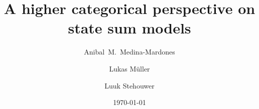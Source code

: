 \documentclass{amsart}
\title{A higher categorical perspective on state sum models}
\author[Medina-Mardones]{Anibal~M.~Medina-Mardones}
\author[Müller]{Lukas Müller}
\author[Stehouwer]{Luuk Stehouwer}
\date{\today}
\begin{document}
	
	\maketitle
	
	
    
 	
    
    
   	
   
    
	\sloppy
	\printbibliography
	\todos
\end{document}
